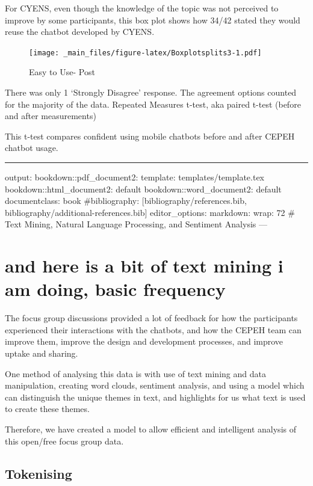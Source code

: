 \documentclass[a4paper, nobind]{templates/ociamthesis}
\begin{document}
For CYENS, even though the knowledge of the topic was not perceived to
improve by some participants, this box plot shows how 34/42 stated they
would reuse the chatbot developed by CYENS.

\begin{figure}
\centering
\texttt{[image: \_main\_files/figure-latex/Boxplotsplits3-1.pdf]}
\caption{\label{fig:Boxplotsplits3}Easy to Use- Post}
\end{figure}

There was only 1 `Strongly Disagree' response. The agreement options
counted for the majority of the data.
Repeated Measures t-test, aka paired t-test (before and after
measurements)

This t-test compares confident using mobile chatbots before and after
CEPEH chatbot usage.

\begin{center}\rule{0.5\linewidth}{0.5pt}\end{center}

output:
bookdown::pdf\_document2:
template: templates/template.tex
bookdown::html\_document2: default
bookdown::word\_document2: default
documentclass: book
\#bibliography: {[}bibliography/references.bib, bibliography/additional-references.bib{]}
editor\_options:
markdown:
wrap: 72
\# Text Mining, Natural Language Processing, and Sentiment Analysis
---

\hypertarget{and-here-is-a-bit-of-text-mining-i-am-doing-basic-frequency}{%
\chapter{and here is a bit of text mining i am doing, basic frequency}\label{and-here-is-a-bit-of-text-mining-i-am-doing-basic-frequency}}

The focus group discussions provided a lot of feedback for how the
participants experienced their interactions with the chatbots, and how
the CEPEH team can improve them, improve the design and development
processes, and improve uptake and sharing.

One method of analysing this data is with use of text mining and data
manipulation, creating word clouds, sentiment analysis, and using a
model which can distinguish the unique themes in text, and highlights
for us what text is used to create these themes.

Therefore, we have created a model to allow efficient and intelligent
analysis of this open/free focus group data.

\hypertarget{tokenising}{%
\section{Tokenising}\label{tokenising}}
\end{document}
